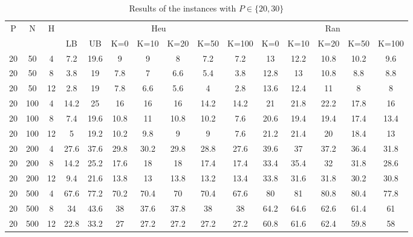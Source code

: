 \documentclass[review,3p,times,authoryear,12pt]{elsarticle}
\begin{document}
\begin{table}[!htbp]
\small
  \centering
  \setlength{\belowcaptionskip}{10pt}
  \caption{Results of the instances with $P\in\{20, 30\}$}
  \begin{tabular}{ccccccccccccccc}
  \hline
  \multicolumn{1}{c}{\multirow{2}{*}{P}}
  & \multicolumn{1}{c}{\multirow{2}{*}{N}}
  & \multicolumn{1}{c}{\multirow{2}{*}{H}}
  & \multicolumn{7}{c}{Heu}
  & \multicolumn{5}{c}{Ran}\\
  \cline{4-15}
  \multicolumn{1}{c}{}
  &\multicolumn{1}{c}{}
  &\multicolumn{1}{c}{}
  &\multicolumn{1}{c}{LB}&{UB}&{K=0}&{K=10}&{K=20}&{K=50}&{K=100}
  &\multicolumn{1}{c}{K=0}&{K=10}&{K=20}&{K=50}&{K=100}\\
  \hline

    20    & 50    & 4     & 7.2   & 19.6  & 9     & 9     & 8     & 7.2   & 7.2   & 13    & 12.2  & 10.8  & 10.2  & 9.6 \\
    20    & 50    & 8     & 3.8   & 19    & 7.8   & 7     & 6.6   & 5.4   & 3.8   & 12.8  & 13    & 10.8  & 8.8   & 8.8 \\
    20    & 50    & 12    & 2.8   & 19    & 7.8   & 6.6   & 5.6   & 4     & 2.8   & 13.6  & 12.4  & 11    & 8     & 8 \\
    20    & 100   & 4     & 14.2  & 25    & 16    & 16    & 16    & 14.2  & 14.2  & 21    & 21.8  & 22.2  & 17.8  & 16 \\
    20    & 100   & 8     & 7.4   & 19.6  & 10.8  & 11    & 10.8  & 10.2  & 7.6   & 20.6  & 19.4  & 19.4  & 17.4  & 13.4 \\
    20    & 100   & 12    & 5     & 19.2  & 10.2  & 9.8   & 9     & 9     & 7.6   & 21.2  & 21.4  & 20    & 18.4  & 13 \\
    20    & 200   & 4     & 27.6  & 37.6  & 29.8  & 30.2  & 29.8  & 28.8  & 27.6  & 39.6  & 37    & 37.2  & 36.4  & 31.8 \\
    20    & 200   & 8     & 14.2  & 25.2  & 17.6  & 18    & 18    & 17.4  & 17.4  & 33.4  & 35.4  & 32    & 31.8  & 28.6 \\
    20    & 200   & 12    & 9.4   & 21.6  & 13.8  & 13    & 13.8  & 13.2  & 13.4  & 33.8  & 31.6  & 31.8  & 30.2  & 30.8 \\
    20    & 500   & 4     & 67.6  & 77.2  & 70.2  & 70.4  & 70    & 70.4  & 67.6  & 80    & 81    & 80.8  & 80.4  & 77.8 \\
    20    & 500   & 8     & 34    & 43.6  & 38    & 37.6  & 37.8  & 38    & 38    & 64.2  & 64.6  & 62.6  & 61.4  & 61 \\
    20    & 500   & 12    & 22.8  & 33.2  & 27    & 27.2  & 27.2  & 27.2  & 27.2  & 60.8  & 61.6  & 62.4  & 59.8  & 58 \\

\end{tabular}
\end{table}
\end{document}
